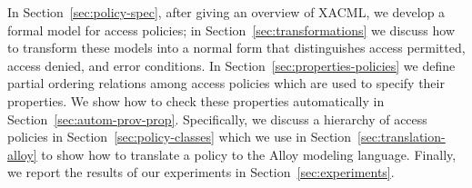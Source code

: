 In Section~\ref{sec:policy-spec}, after giving an overview
of XACML, we develop a formal model for access
policies; in Section~\ref{sec:transformations} we discuss how to
transform these models into a normal form that distinguishes access
permitted, access denied, and error conditions.  In
Section~\ref{sec:properties-policies} we define partial ordering
relations among access policies which are used to specify their
properties.  We show how to check these properties automatically in
Section~\ref{sec:autom-prov-prop}.  Specifically, we discuss a
hierarchy of access policies in Section~\ref{sec:policy-classes} which
we use in Section~\ref{sec:translation-alloy} to show how to translate
a policy to the Alloy modeling language.  Finally, we report the
results of our experiments in Section~\ref{sec:experiments}.



